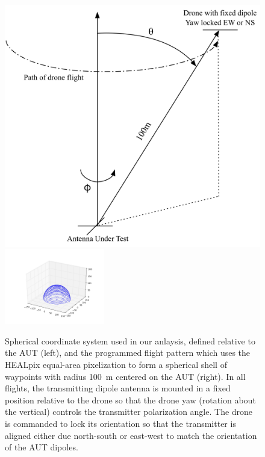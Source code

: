 \documentclass[preprint2,numberedappendix,tighten,twocolappendix]{aastex6}
\begin{document}


\begin{figure}[htb]
\begin{center}
\includegraphics[width=0.6\columnwidth]{figures/ECHO_flight_diagram.png}
\includegraphics[width=0.39\textwidth]{figures/ECHO_flight_path.png}
\caption{Spherical coordinate system used in our anlaysis, defined relative to the AUT (left), and the programmed flight pattern which uses the HEALpix equal-area pixelization to form a spherical shell of waypoints with radius 100~m centered on the AUT (right). In all flights, the transmitting dipole antenna is mounted in a fixed position relative to the drone so that the drone yaw (rotation about the vertical) controls the transmitter polarization angle.  The drone is commanded to lock its orientation so that the transmitter is aligned either due north-south or east-west to match the orientation of the AUT dipoles. \label{fig:fligh_path}}
\end{center}
\end{figure}
\end{document}
